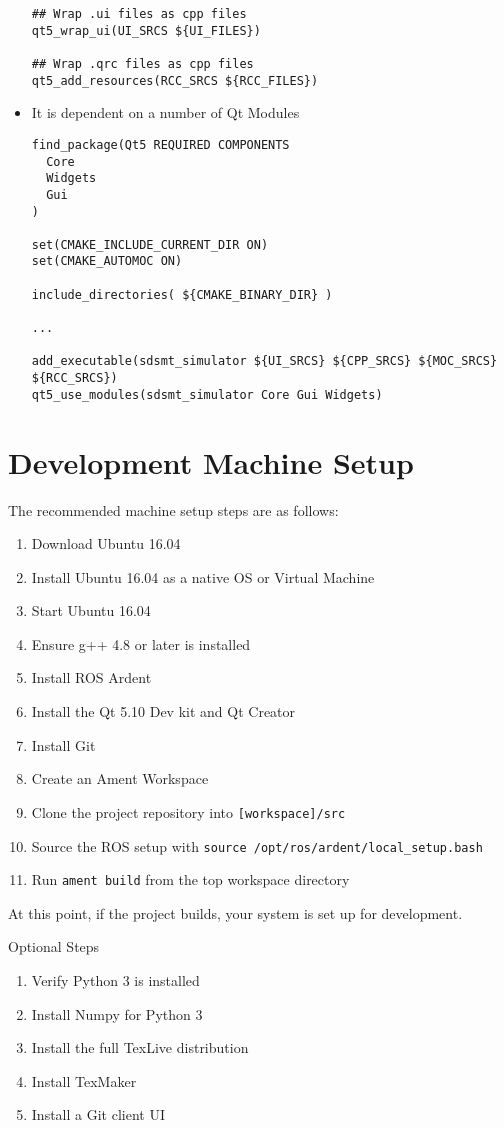 \begin{itemize}
\begin{lstlisting}
## Wrap .ui files as cpp files
qt5_wrap_ui(UI_SRCS ${UI_FILES})

## Wrap .qrc files as cpp files
qt5_add_resources(RCC_SRCS ${RCC_FILES})
	\end{lstlisting}
	\item It is dependent on a number of Qt Modules
	\begin{lstlisting}
find_package(Qt5 REQUIRED COMPONENTS
  Core
  Widgets
  Gui
)

set(CMAKE_INCLUDE_CURRENT_DIR ON)
set(CMAKE_AUTOMOC ON)

include_directories( ${CMAKE_BINARY_DIR} )

...

add_executable(sdsmt_simulator ${UI_SRCS} ${CPP_SRCS} ${MOC_SRCS} ${RCC_SRCS})
qt5_use_modules(sdsmt_simulator Core Gui Widgets)
	\end{lstlisting}
\end{itemize}

\section{Development Machine Setup}
The recommended machine setup steps are as follows:
\begin{enumerate}
	\item Download Ubuntu 16.04
	\item Install Ubuntu 16.04 as a native OS or Virtual Machine
	\item Start Ubuntu 16.04
	\item Ensure g++ 4.8 or later is installed
	\item Install ROS Ardent
	\item Install the Qt 5.10 Dev kit and Qt Creator
	\item Install Git
	\item Create an Ament Workspace
	\item Clone the project repository into \lstinline|[workspace]/src|
	\item Source the ROS setup with \lstinline|source /opt/ros/ardent/local_setup.bash|
	\item Run \lstinline|ament build| from the top workspace directory
\end{enumerate}
At this point, if the project builds, your system is set up for development.

Optional Steps
\begin{enumerate}
	\item Verify Python 3 is installed
	\item Install Numpy for Python 3
	\item Install the full TexLive distribution
	\item Install TexMaker
	\item Install a Git client UI
\end{enumerate}
